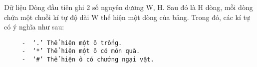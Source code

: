 Dữ liệu  
Dòng đầu tiên ghi 2 số nguyên dương W, H. Sau đó là H dòng, mỗi dòng chứa một chuỗi kí tự độ dài W thể hiện một dòng của bảng. Trong đó, các kí tự có ý nghĩa như sau:  
\begin{verbatim}
     -	‘.’ Thể hiện một ô trống.
     -	‘*’ Thể hiện một ô có món quà.
     -	‘#’ Thể hiện ô có chướng ngại vật.
\end{verbatim}